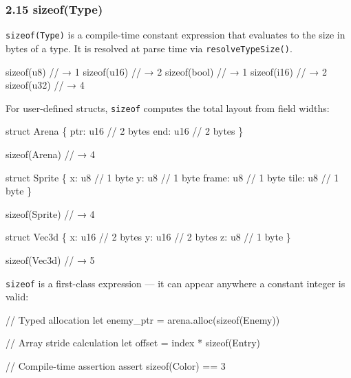 \documentclass[
  11pt,
]{article}
\newenvironment{Shaded}{}{}
\newcommand{\NormalTok}[1]{#1}
\begin{document}
\subsubsection{2.15 sizeof(Type)}\label{sizeoftype}

\texttt{sizeof(Type)} is a compile-time constant expression that
evaluates to the size in bytes of a type. It is resolved at parse time
via \texttt{resolveTypeSize()}.

\begin{Shaded}
\begin{Highlighting}[]
\NormalTok{sizeof(u8)     // → 1}
\NormalTok{sizeof(u16)    // → 2}
\NormalTok{sizeof(bool)   // → 1}
\NormalTok{sizeof(i16)    // → 2}
\NormalTok{sizeof(u32)    // → 4}
\end{Highlighting}
\end{Shaded}

For user-defined structs, \texttt{sizeof} computes the total layout from
field widths:

\begin{Shaded}
\begin{Highlighting}[]
\NormalTok{struct Arena \{}
\NormalTok{    ptr: u16    // 2 bytes}
\NormalTok{    end: u16    // 2 bytes}
\NormalTok{\}}

\NormalTok{sizeof(Arena)   // → 4}

\NormalTok{struct Sprite \{}
\NormalTok{    x: u8       // 1 byte}
\NormalTok{    y: u8       // 1 byte}
\NormalTok{    frame: u8   // 1 byte}
\NormalTok{    tile: u8    // 1 byte}
\NormalTok{\}}

\NormalTok{sizeof(Sprite)  // → 4}

\NormalTok{struct Vec3d \{}
\NormalTok{    x: u16      // 2 bytes}
\NormalTok{    y: u16      // 2 bytes}
\NormalTok{    z: u8       // 1 byte}
\NormalTok{\}}

\NormalTok{sizeof(Vec3d)   // → 5}
\end{Highlighting}
\end{Shaded}

\texttt{sizeof} is a first-class expression --- it can appear anywhere a
constant integer is valid:

\begin{Shaded}
\begin{Highlighting}[]
\NormalTok{// Typed allocation}
\NormalTok{let enemy\_ptr = arena.alloc(sizeof(Enemy))}

\NormalTok{// Array stride calculation}
\NormalTok{let offset = index * sizeof(Entry)}

\NormalTok{// Compile{-}time assertion}
\NormalTok{assert sizeof(Color) == 3}
\end{Highlighting}
\end{Shaded}
\end{document}
